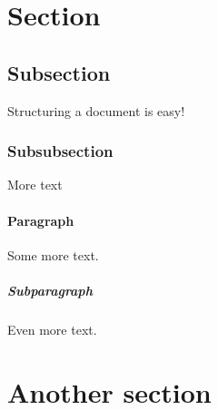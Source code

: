 \documentclass{article}
\begin{document}
	\section{Section}
	\subsection{Subsection}
	Structuring a document is easy!
	\subsubsection{Subsubsection}
	More text
	\paragraph{Paragraph}
	Some more text.
	\subparagraph{Subparagraph}
	Even more text.
	\section{Another section}
\end{document}
